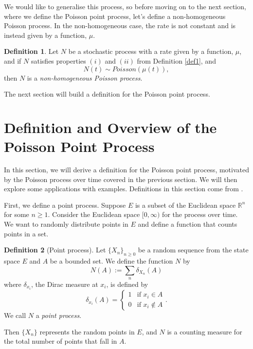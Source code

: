 \documentclass[11pt, oneside]{article}   	%
\theoremstyle{definition}
\newtheorem{definition}{Definition}[section]
\theoremstyle{remark}
\begin{document}
We would like to generalise this process, so before moving on to the next section, where we define the Poisson point process, let's define a non-homogeneous Poisson process. In the non-homogeneous case, the rate is not constant and is instead given by a function, $\mu$.
\begin{definition}
  Let $N$ be a stochastic process with a rate given by a function, $\mu$, and if $N$ satisfies properties $(i)$ and $(ii)$ from Definition \ref{def1}, and
  $$N(t) \sim \textit{Poisson}(\mu(t)),$$
  then $N$ is a \textit{non-homogeneous Poisson process}.
\end{definition}

The next section will build a definition for the Poisson point process.




\newpage
\section{Definition and Overview of the Poisson Point Process} \label{overview}
In this section, we will derive a definition for the Poisson point process, motivated by the Poisson process over time covered in the previous section. We will then explore some applications with examples. Definitions in this section come from \cite{resnick2005}.

\vspace{5mm}

First, we define a point process. Suppose $E$ is a subset of the Euclidean space $\mathbb{R}^n$ for some $n\geq 1$. Consider the Euclidean space $[0,\infty)$ for the process over time. We want to randomly distribute points in $E$ and define a function that counts points in a set. 

\begin{definition}[Point process] \label{pointprocess}
  Let $\{X_n\}_{n\geq 0}$ be a random sequence from the state space $E$ and $A$ be a bounded set. We define the function $N$ by
  $$ N(A):=\sum_{n}{\delta_{X_n} (A)} $$ 
  where $\delta_{x_i}$, the Dirac measure at $x_i$, is defined by
  $$\delta_{x_i}(A) = \begin{cases} 1 &\text{if } x_i \in A \\ 0 &\text{if } x_i \notin A \end{cases}.$$ 
  We call $N$ a \textit{point process}.
\end{definition}

Then $\{X_n\}$ represents the random points in $E$, and $N$ is a counting measure for the total number of points that fall in $A$.
\end{document}
